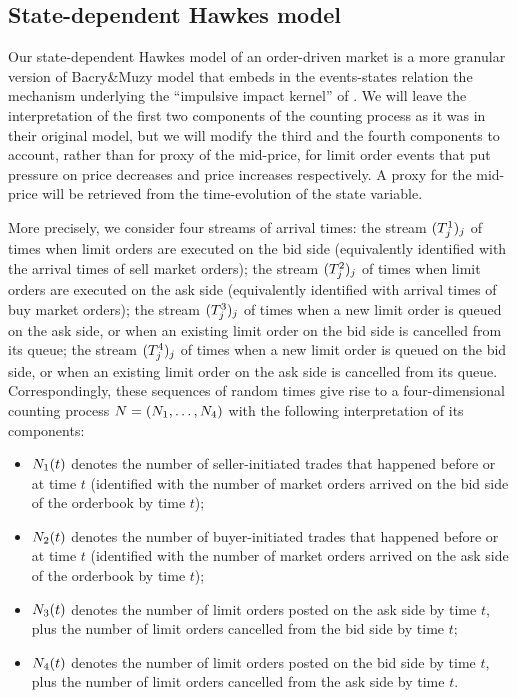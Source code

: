 \documentclass[10pt, article,table]{article}
\begin{document}
\subsection{State-dependent Hawkes model}\label{sec.sdHawkes_model}
Our state-dependent Hawkes model of an order-driven market is a more granular version of Bacry\&Muzy model that embeds in the events-states relation the mechanism underlying the ``impulsive impact kernel'' of \citealp{BM14haw}.
We will leave the interpretation of the first two components of the counting process as it was in their original model, but we will modify the third and the fourth components to account, rather than for proxy of the mid-price, for limit order events that put pressure on price decreases and price increases respectively. A proxy for the mid-price will be retrieved from the time-evolution of the state variable. 

More precisely, we consider four streams of arrival times: the stream $(\arrivalTimes[1]_j)_j$ of times when limit orders are executed on the bid side (equivalently identified with the arrival times of sell market orders); the stream  $(\arrivalTimes[2]_j)_j$ of times when limit orders are executed on the ask side (equivalently identified with arrival times of buy market orders); the stream  $(\arrivalTimes[3]_j)_j$ of times when a new limit order is queued on the ask side, or when an existing limit order on the bid side is cancelled from its queue; the stream  $(\arrivalTimes[4]_j)_j$ of times when a new limit order is queued on the bid side, or when an existing limit order on the ask side is cancelled from its queue. Correspondingly, these sequences of random times give rise to a four-dimensional counting process $\multiCountingProc=(\countingProc[1],\dots, \countingProc[4])$ with the following interpretation of its components:
\begin{itemize}
 \item $\countingProc[1](t)$ denotes the number of seller-initiated trades that happened before or at time $t$ (identified with the number of market orders arrived on the bid side of the orderbook by time $t$);
 \item $\countingProc[2](t)$ denotes the number of buyer-initiated trades that happened before or at time $t$ (identified with the number of market orders arrived on the ask side of the orderbook by time $t$);
 \item $\countingProc[3](t)$ denotes the number of limit orders posted on the ask side by time $t$, plus the number of limit orders cancelled from the bid side by time $t$;
 \item $\countingProc[4](t)$ denotes the number of limit orders posted on the bid side by time $t$, plus the number of limit orders cancelled from the ask side by time $t$.
\end{itemize}
\end{document}

